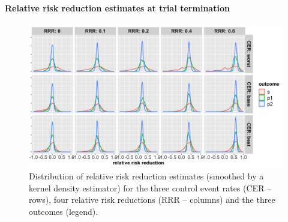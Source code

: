 \documentclass[]{article}
\let\oldparagraph\paragraph
\renewcommand{\paragraph}[1]{\oldparagraph{#1}\mbox{}}
\begin{document}
\hypertarget{relative-risk-reduction-estimates-at-trial-termination-2}{%
\paragraph{Relative risk reduction estimates at trial
termination}\label{relative-risk-reduction-estimates-at-trial-termination-2}}

\begin{figure}
  \caption{Distribution of relative risk reduction estimates (smoothed by a kernel density estimator) for the three
  control event rates (CER – rows), four relative risk reductions (RRR – columns) and the three outcomes (legend).}
  \includegraphics{../p1_plots/batch_size_nb_3000/RRRhat_p1.png}
\end{figure}
\end{document}
